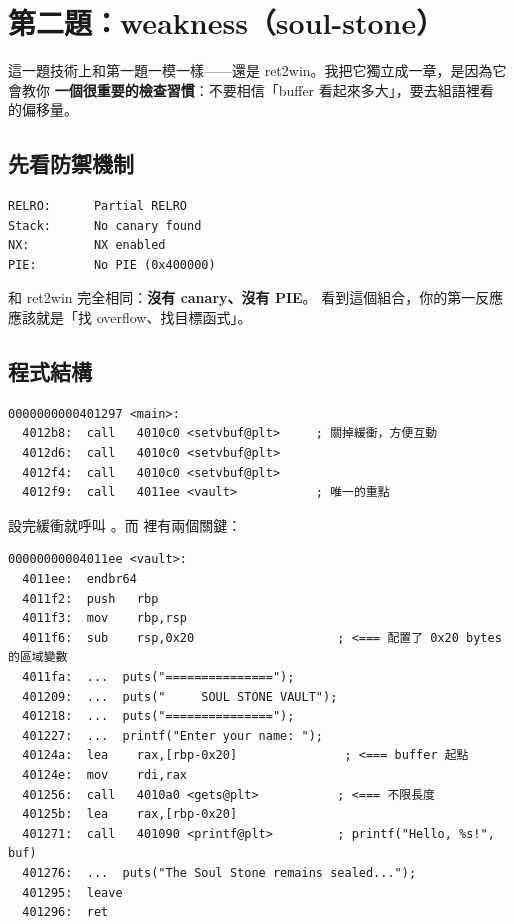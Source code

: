 \section{第二題：weakness（soul-stone）}
\label{chap:weakness}

這一題技術上和第一題一模一樣——還是 ret2win。我把它獨立成一章，是因為它會教你
\textbf{一個很重要的檢查習慣}：不要相信「buffer 看起來多大」，要去組語裡看  的偏移量。

\subsection{先看防禦機制}

\begin{lstlisting}[style=raw]
RELRO:      Partial RELRO
Stack:      No canary found
NX:         NX enabled
PIE:        No PIE (0x400000)
\end{lstlisting}

和 ret2win 完全相同：\textbf{沒有 canary、沒有 PIE}。
看到這個組合，你的第一反應應該就是「找 overflow、找目標函式」。

\subsection{程式結構}

\begin{lstlisting}[style=asm]
0000000000401297 <main>:
  4012b8:  call   4010c0 <setvbuf@plt>     ; 關掉緩衝，方便互動
  4012d6:  call   4010c0 <setvbuf@plt>
  4012f4:  call   4010c0 <setvbuf@plt>
  4012f9:  call   4011ee <vault>           ; 唯一的重點
\end{lstlisting}

 設完緩衝就呼叫 。而  裡有兩個關鍵：

\begin{lstlisting}[style=asm]
00000000004011ee <vault>:
  4011ee:  endbr64
  4011f2:  push   rbp
  4011f3:  mov    rbp,rsp
  4011f6:  sub    rsp,0x20                    ; <=== 配置了 0x20 bytes 的區域變數
  4011fa:  ...  puts("===============");
  401209:  ...  puts("     SOUL STONE VAULT");
  401218:  ...  puts("===============");
  401227:  ...  printf("Enter your name: ");
  40124a:  lea    rax,[rbp-0x20]               ; <=== buffer 起點
  40124e:  mov    rdi,rax
  401256:  call   4010a0 <gets@plt>           ; <=== 不限長度
  40125b:  lea    rax,[rbp-0x20]
  401271:  call   401090 <printf@plt>         ; printf("Hello, %s!", buf)
  401276:  ...  puts("The Soul Stone remains sealed...");
  401295:  leave
  401296:  ret
\end{lstlisting}

